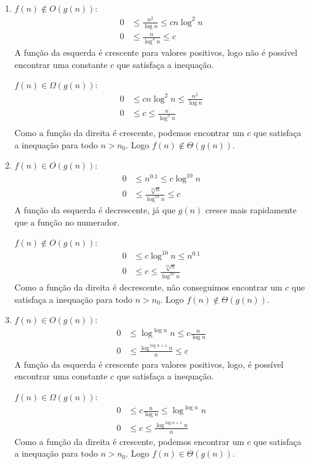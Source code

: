 \documentclass{article}
\begin{document}
\begin{enumerate}
\begin{enumerate}
		\item $f(n) \notin O(g(n))$:
		\begin{align*}
			0 &\le \frac{n^2}{\log n} \le c n \log^2 n \\
			0 &\le \frac{n}{\log^3 n} \le c
		\end{align*}
		A função  da esquerda é crescente para valores positivos, logo não é
		possível encontrar uma constante $c$ que satisfaça a inequação.

		$f(n) \in \Omega(g(n))$:
		\begin{align*}
			0 &\le c n \log^2 n \le \frac{n^2}{\log n} \\
			0 &\le c \le \frac{n}{\log^3 n} \\
		\end{align*}
		Como a função da direita é crescente, podemos encontrar um $c$ que
		satisfaça a inequação para todo $n > n_0$. Logo $f(n) \notin
		\Theta(g(n))$.

    \item $f(n) \in O(g(n))$:
      \begin{align*}
        0 &\le {n^{0.1}} \le c \log^{10} n \\
        0 &\le \frac{\sqrt[10]{n}}{\log^{10} n} \le c
      \end{align*}
      A função da esquerda é decrescente, já que $g(n)$ cresce mais rapidamente
      que a função no numerador.

        $f(n) \notin O(g(n))$:
      \begin{align*}
        0 &\le c \log^{10} n \le {n^{0.1}}\\
        0 &\le c \le \frac{\sqrt[10]{n}}{\log^{10} n}
      \end{align*}
          Como a função da direita é decrescente, não conseguimos encontrar um $c$ que
      satisfaça a inequação para todo $n > n_0$. Logo $f(n) \notin
      \Theta(g(n))$.

		\item $f(n) \in O(g(n))$:
		\begin{align*}
      0 &\le {\log ^{\log n} n} \le c \frac{n}{\log n} \\
      0 &\le \frac{\log ^{\log n + 1} n}{n} \le c
		\end{align*}
		A função da esquerda é crescente para valores positivos, logo, é
		possível encontrar uma constante $c$ que satisfaça a inequação.

		$f(n) \in \Omega(g(n))$:
		\begin{align*}
      0 &\le  c \frac{n}{\log n} \le {\log ^{\log n} n} \\
      0 &\le c \le \frac{\log ^{\log n + 1} n}{n}
		\end{align*}
		Como a função da direita é crescente, podemos encontrar um $c$ que
		satisfaça a inequação para todo $n > n_0$. Logo $f(n) \in
		\Theta(g(n))$.


\end{enumerate}
\end{enumerate}
\end{document}
